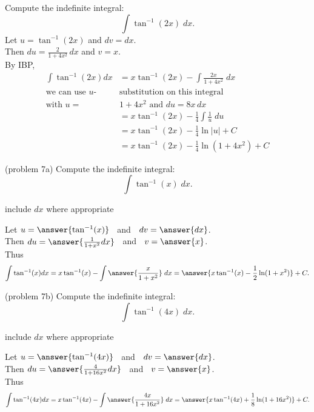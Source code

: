 \documentclass[handout]{ximera}
\begin{document}
\begin{example}[example 7]
Compute the indefinite integral:
  \[
  \int \tan^{-1}(2x) \;dx.
  \]
Let $u = \tan^{-1}(2x)$   and   $dv = dx$.\\
  Then $du = \frac{2}{1+4x^2}\, dx$   and   $v = x$.\\
By IBP,
  \begin{align*}
  \int  \tan^{-1}(2x) dx &= x\tan^{-1}(2x) - \int \frac{2x}{1+4x^2} \;dx\\
  \text{we can use $u$-} & \text{substitution on this integral} \\
  \text{with $u =$} &  1+4x^2 \text{ and } du = 8x \, dx \\
  &= x\tan^{-1}(2x) - \frac14 \int \frac{1}{u} \; du\\
  &= x\tan^{-1}(2x) - \frac14 \ln|u| + C\\
  &= x\tan^{-1}(2x) - \frac14 \ln(1+4x^2) + C
  \end{align*}
  
\end{example}

\begin{problem}(problem 7a)
Compute the indefinite integral:
  \[
  \int \tan^{-1}(x) \;dx.
  \]
\begin{hint}
      include $dx$ where appropriate
  \end{hint}
  Let $u = \answer{\tan^{-1}(x)}\;\;$   and   $\;\;dv = \answer{dx}$.\\
  Then $du = \answer{\frac{1}{1+x^2} dx}\;\;$   and   $\;\;v = \answer{x}$.\\
  Thus 
  \[
  \int \tan^{-1}(x) dx = x\tan^{-1}(x) - \int \answer{\frac{x}{1+x^2}} \;dx = \answer{x\tan^{-1}(x) -\frac12 \ln(1+x^2)} + C.
  \]
\end{problem}

\begin{problem}(problem 7b)
Compute the indefinite integral:
  \[
  \int \tan^{-1}(4x) \;dx.
  \]
\begin{hint}
      include $dx$ where appropriate
  \end{hint}
  Let $u = \answer{\tan^{-1}(4x)}\;\;$   and   $\;\;dv = \answer{dx}$.\\
  Then $du = \answer{\frac{4}{1+16x^2} dx}\;\;$   and   $\;\;v = \answer{x}$.\\
  Thus 
  \[
  \int \tan^{-1}(4x) dx = x\tan^{-1}(4x) - \int \answer{\frac{4x}{1+16x^2}} \;dx = \answer{x\tan^{-1}(4x) +\frac18 \ln(1+16x^2)} + C.
  \]
\end{problem}
\end{document}
